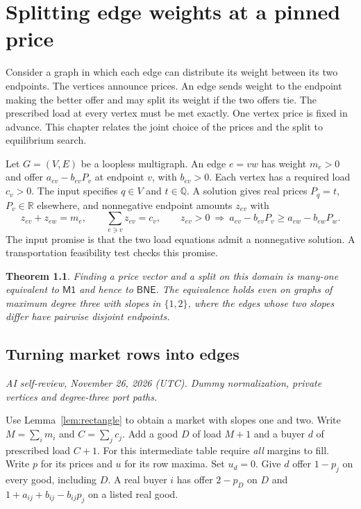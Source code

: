 \documentclass[11pt,oneside,openany,notitlepage]{report}
\newtheorem{theorem}{Theorem}[chapter]
\newcommand{\Market}{\mathsf{M1}}
\newcommand{\BNE}{\mathsf{BNE}}
\newcommand{\reviewdate}{November 26, 2026 (UTC)}
\newcommand{\reviewmark}[1]{\par\nopagebreak[4]\noindent
  {\footnotesize\itshape AI self-review, \reviewdate. #1\par}\nobreak\smallskip}
\begin{document}
\chapter{Splitting edge weights at a pinned price}\label{sec:pinned}

Consider a graph in which each edge can distribute its weight between its
two endpoints. The vertices announce prices. An edge sends weight to the
endpoint making the better offer and may split its weight if the two offers
tie. The prescribed load at every vertex must be met exactly. One vertex
price is fixed in advance. This chapter relates the joint choice of the
prices and the split to equilibrium search.

Let \(G=(V,E)\) be a loopless multigraph. An edge \(e=vw\) has weight
\(m_e>0\) and offer \(a_{ev}-b_{ev}P_v\) at endpoint \(v\), with
\(b_{ev}>0\). Each vertex has a required load \(c_v>0\). The input specifies
\(q\in V\) and \(t\in\mathbb Q\). A solution gives real prices \(P_q=t\),
\(P_v\in\mathbb R\) elsewhere, and nonnegative endpoint amounts \(z_{ev}\)
with
\[
 z_{ev}+z_{ew}=m_e,\qquad \sum_{e\ni v}z_{ev}=c_v,\qquad
 z_{ev}>0\ \Longrightarrow\
 a_{ev}-b_{ev}P_v\ge a_{ew}-b_{ew}P_w .
\]
The input promise is that the two load equations admit a nonnegative
solution. A transportation feasibility test checks this promise.

\begin{theorem}\label{thm:pinned}
Finding a price vector and a split on this domain is many-one equivalent to
\(\Market\) and hence to \(\BNE\). The equivalence holds even on graphs of
maximum degree three with slopes in \(\{1,2\}\), where the edges whose two
slopes differ have pairwise disjoint endpoints.
\end{theorem}

\section{Turning market rows into edges}
\reviewmark{Dummy normalization, private vertices and degree-three port paths.}

Use Lemma~\ref{lem:rectangle} to obtain a market with slopes one and two.
Write \(M=\sum_i m_i\) and \(C=\sum_j c_j\). Add a good \(D\) of load
\(M+1\) and a buyer \(d\) of prescribed load \(C+1\). For this intermediate
table require \emph{all} margins to fill. Write \(p\) for its prices and
\(u\) for its row maxima. Set \(u_d=0\). Give \(d\) offer \(1-p_j\) on
every good, including \(D\). A real buyer \(i\) has offer \(2-p_D\) on
\(D\) and \(1+a_{ij}+b_{ij}-b_{ij}p_j\) on a listed real good.
\end{document}
